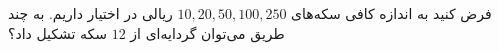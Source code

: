 \EXERCISE
فرض کنید به اندازه کافی سکه‌های
$10, 20, 50, 100, 250$
ریالی در اختیار داریم. به چند طریق می‌توان گردایه‌ای از
$12$
سکه تشکیل داد؟